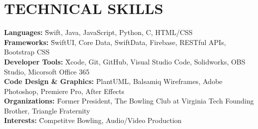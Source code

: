 \documentclass[10pt]{article}
\begin{document}
\section*{TECHNICAL SKILLS}

\begin{tabbing}
\hspace{0.25cm} \= \textbf{Languages:} \= Swift, Java, JavaScript, Python, C, HTML/CSS \\
\> \textbf{Frameworks:} \= SwiftUI, Core Data, SwiftData, Firebase, RESTful APIs, Bootstrap CSS \\
\> \textbf{Developer Tools:} \= Xcode, Git, GitHub, Visual Studio Code, Solidworks, OBS Studio, Micorsoft Office 365 \\
\> \textbf{Code Design \& Graphics:} \= PlantUML, Balsamiq Wireframes, Adobe Photoshop, Premiere Pro, After Effects \\
\> \textbf{Organizations:} \= Former President, The Bowling Club at Virginia Tech \textbar{} Founding Brother, Triangle Fraternity\\
\> \textbf{Interests:} \= Competitve Bowling, Audio/Video Production

\end{tabbing}
\end{document}
